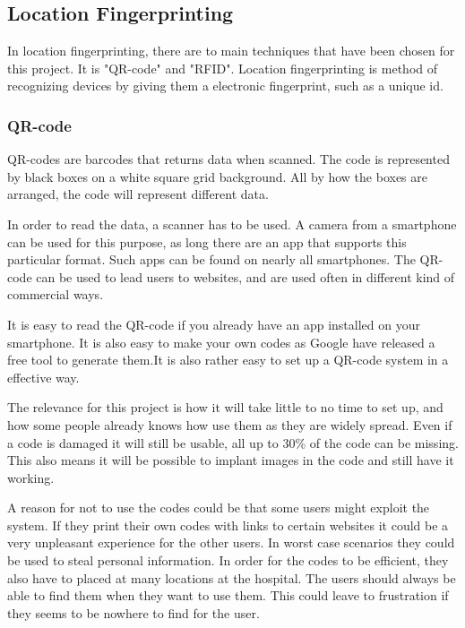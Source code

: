 \subsection{Location Fingerprinting}
In location fingerprinting, there are to main techniques that have been chosen for this project. It is "QR-code" and "RFID".
Location fingerprinting is method of recognizing devices by giving them a electronic fingerprint, such as a unique id.



\subsubsection{QR-code} %
QR-codes are barcodes that returns data when scanned. The code is represented by black boxes on a white square grid background. All by how the boxes are arranged, the code will represent different data.

In order to read the data, a scanner has to be used. A camera from a smartphone can be used for this purpose, as long there are an app that supports this particular format. Such apps can be found on nearly all smartphones\cite{QR_smart}. The QR-code can be used to lead users to websites, and are used often in different kind of commercial ways\cite{QR_url}.

It is easy to read the QR-code if you already have an app installed on your smartphone. It is also easy to make your own codes as Google have released a free tool to generate them\cite{QR_Google}.It is also rather easy to set up a QR-code system in a effective way\cite{QR_easy}.

The relevance for this project is how it will take little to no time to set up\cite{QR_rel1}, and how some people already knows how use them as they are widely spread\cite{QR_spread}. Even if a code is damaged it will still be usable, all up to 30\% of the code can be missing\cite{QR_dama}. This also means it will be possible to implant images in the code and still have it working\cite{QR_image}.

A reason for not to use the codes could be that some users might exploit the system. If they print their own codes with links to certain websites it could be a very unpleasant experience for the other users\cite{QR_urlbad}. In worst case scenarios they could be used to steal personal information\cite{QR_information}.
In order for the codes to be efficient, they also have to placed at many locations at the hospital. The users should always be able to find them when they want to use them. This could leave to frustration if they seems to be nowhere to find for the user.


